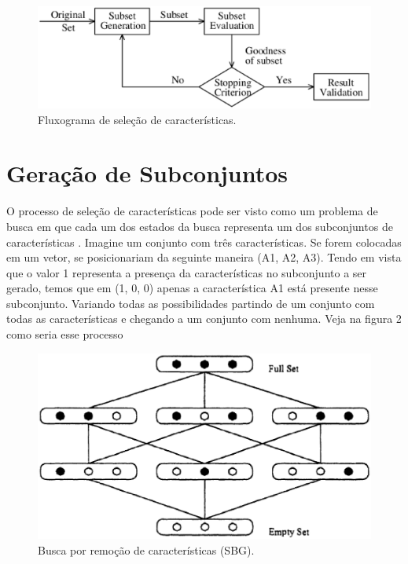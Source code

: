 \begin{figure}[h]
	\centering
	\label{fig02}
		\includegraphics[keepaspectratio=true,scale=0.6]{figuras/fig02.eps}
	\caption{Fluxograma de seleção de características. \cite{liu_2005}}
\end{figure}

\section{Geração de Subconjuntos}

O processo de seleção de características pode ser visto como um problema de busca em que cada um dos estados da busca representa um dos subconjuntos de características \cite{huan_1998}. Imagine um conjunto com três características. Se forem colocadas em um vetor, se posicionariam da seguinte maneira (A1, A2, A3). Tendo em vista que o valor 1 representa a presença da características no subconjunto a ser gerado, temos que em (1, 0, 0) apenas a característica A1 está presente nesse subconjunto. Variando todas as possibilidades partindo de um conjunto com todas as características e chegando a um conjunto com nenhuma. Veja na figura 2 como seria esse processo

\begin{figure}[h]
	\centering
	\label{fig03}
		\includegraphics[keepaspectratio=true,scale=0.6]{figuras/fig03.eps}
	\caption{Busca por remoção de características (SBG). \cite{huan_1998}}
\end{figure}

